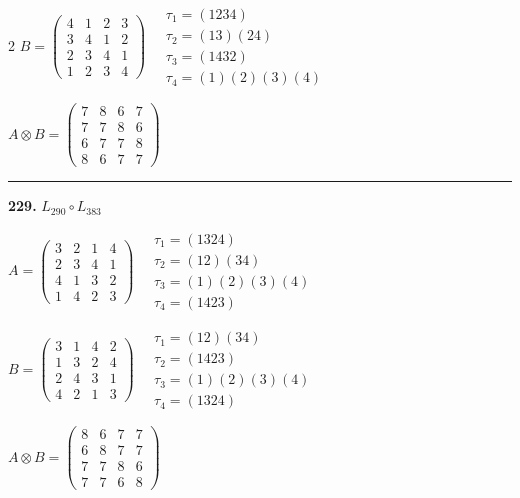 \begin{multicols}{2}
$B = \begin{pmatrix} 4 & 1 & 2 & 3 \\ 3 & 4 & 1 & 2 \\ 2 & 3 & 4 & 1 \\ 1 & 2 & 3 & 4 \end{pmatrix} \quad \begin{matrix} \tau_{1}=(1 2 3 4) \\ \tau_{2}=(1 3)(2 4) \\ \tau_{3}=(1 4 3 2) \\ \tau_{4}=(1)(2)(3)(4) \end{matrix}$

$A \otimes B = \begin{pmatrix} 7 & 8 & 6 & 7 \\ 7 & 7 & 8 & 6 \\ 6 & 7 & 7 & 8 \\ 8 & 6 & 7 & 7 \end{pmatrix}$

\vspace{0.3em}
\hrule
\vspace{0.3em}

\noindent\textbf{229.} $L_{290} \circ L_{383}$

$A = \begin{pmatrix} 3 & 2 & 1 & 4 \\ 2 & 3 & 4 & 1 \\ 4 & 1 & 3 & 2 \\ 1 & 4 & 2 & 3 \end{pmatrix} \quad \begin{matrix} \tau_{1}=(1 3 2 4) \\ \tau_{2}=(1 2)(3 4) \\ \tau_{3}=(1)(2)(3)(4) \\ \tau_{4}=(1 4 2 3) \end{matrix}$

$B = \begin{pmatrix} 3 & 1 & 4 & 2 \\ 1 & 3 & 2 & 4 \\ 2 & 4 & 3 & 1 \\ 4 & 2 & 1 & 3 \end{pmatrix} \quad \begin{matrix} \tau_{1}=(1 2)(3 4) \\ \tau_{2}=(1 4 2 3) \\ \tau_{3}=(1)(2)(3)(4) \\ \tau_{4}=(1 3 2 4) \end{matrix}$

$A \otimes B = \begin{pmatrix} 8 & 6 & 7 & 7 \\ 6 & 8 & 7 & 7 \\ 7 & 7 & 8 & 6 \\ 7 & 7 & 6 & 8 \end{pmatrix}$


\end{multicols}
